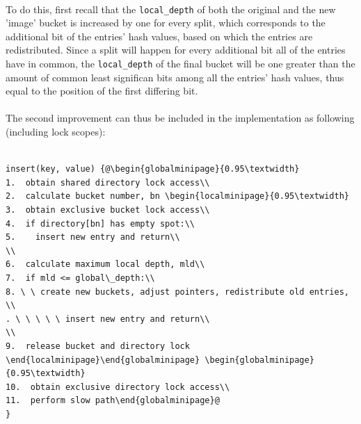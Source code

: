 \documentclass[11pt]{article} %
\begin{document}
\\
To do this, first recall that the \verb|local_depth| of both the original and the new 'image' bucket is increased by one for every split, which corresponds to the additional bit of the entries' hash values, based on which the entries are redistributed. Since a split will happen for every additional bit all of the entries have in common, the \verb|local_depth| of the final bucket will be one greater than the amount of common least significan bits among all the entries' hash values, thus equal to the position of the first differing bit. \\
\\
The second improvement can thus be included in the implementation as following (including lock scopes):\\
\\
\begin{fminipage}{\linewidth}
\begin{lstlisting}[escapechar=@]
insert(key, value) {@\begin{globalminipage}{0.95\textwidth}
1.  obtain shared directory lock access\\
2.  calculate bucket number, bn \begin{localminipage}{0.95\textwidth}
3.  obtain exclusive bucket lock access\\
4.  if directory[bn] has empty spot:\\
5.    insert new entry and return\\
\\
6.  calculate maximum local depth, mld\\
7.  if mld <= global\_depth:\\
8. \ \ create new buckets, adjust pointers, redistribute old entries, \\
. \ \ \ \ \ insert new entry and return\\
\\
9.  release bucket and directory lock \end{localminipage}\end{globalminipage} \begin{globalminipage}{0.95\textwidth}
10.  obtain exclusive directory lock access\\
11.  perform slow path\end{globalminipage}@
}
\end{lstlisting}
\end{fminipage}
\vphantom{fill}\\
\end{document}
